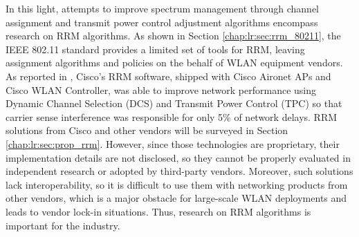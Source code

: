 In this light, attempts to improve spectrum management through channel assignment and transmit power control adjustment algorithms encompass research on RRM algorithms. As shown in Section \ref{chap:lr:sec:rrm_80211}, the IEEE 802.11 standard provides a limited set of tools for RRM, leaving assignment algorithms and policies on the behalf of WLAN equipment vendors. As reported in \cite{suiHowBadAre2015}, Cisco's RRM software, shipped with Cisco Aironet APs and Cisco WLAN Controller, was able to improve network performance using Dynamic Channel Selection (DCS) and Transmit Power Control (TPC) so that carrier sense interference was responsible for only 5\% of network delays. RRM solutions from Cisco and other vendors will be surveyed in Section \ref{chap:lr:sec:prop_rrm}. However, since those technologies are proprietary, their implementation details are not disclosed, so they cannot be properly evaluated in independent research or adopted by third-party vendors. Moreover, such solutions lack interoperability, so it is difficult to use them with networking products from other vendors, which is a major obstacle for large-scale WLAN deployments and leads to vendor lock-in situations. Thus, research on RRM algorithms is important for the industry.

